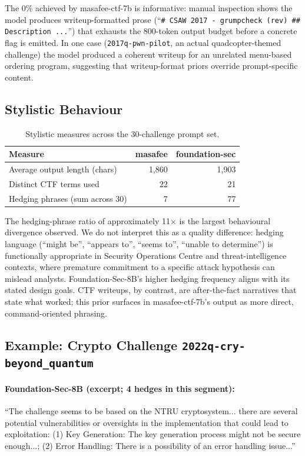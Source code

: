 \documentclass[10pt,twocolumn,a4paper]{article}
\begin{document}
The 0\% achieved by masafee-ctf-7b is informative: manual inspection shows the model produces writeup-formatted prose (``\texttt{\# CSAW 2017 - grumpcheck (rev) \#\# Description ...}'') that exhausts the 800-token output budget before a concrete flag is emitted. In one case (\texttt{2017q-pwn-pilot}, an actual quadcopter-themed challenge) the model produced a coherent writeup for an unrelated menu-based ordering program, suggesting that writeup-format priors override prompt-specific content.

\subsection{Stylistic Behaviour}

\begin{table}[h!]
\centering
\caption{Stylistic measures across the 30-challenge prompt set.}
\label{tab:style}
\small
\begin{tabular}{lrr}
\toprule
Measure & masafee & foundation-sec \\
\midrule
Average output length (chars) & 1{,}860 & 1{,}903 \\
Distinct CTF terms used & 22 & 21 \\
Hedging phrases (sum across 30) & 7 & 77 \\
\bottomrule
\end{tabular}
\end{table}

The hedging-phrase ratio of approximately 11$\times$ is the largest behavioural divergence observed. We do not interpret this as a quality difference: hedging language (``might be'', ``appears to'', ``seems to'', ``unable to determine'') is functionally appropriate in Security Operations Centre and threat-intelligence contexts, where premature commitment to a specific attack hypothesis can mislead analysts. Foundation-Sec-8B's higher hedging frequency aligns with its stated design goals. CTF writeups, by contrast, are after-the-fact narratives that state what worked; this prior surfaces in masafee-ctf-7b's output as more direct, command-oriented phrasing.

\subsection{Example: Crypto Challenge \texttt{2022q-cry-beyond\_quantum}}

\paragraph{Foundation-Sec-8B (excerpt; 4 hedges in this segment):}
``The challenge seems to be based on the NTRU cryptosystem... there are several potential vulnerabilities or oversights in the implementation that could lead to exploitation: (1) Key Generation: The key generation process might not be secure enough...; (2) Error Handling: There is a possibility of an error handling issue...''
\end{document}
